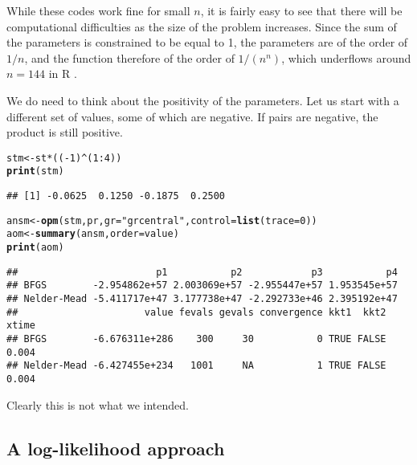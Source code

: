 \documentclass[11pt]{article}\usepackage[]{graphicx}\usepackage[]{color}
\makeatletter
\newcommand{\hlnum}[1]{\textcolor[rgb]{0.686,0.059,0.569}{#1}}%
\newcommand{\hlstr}[1]{\textcolor[rgb]{0.192,0.494,0.8}{#1}}%
\newcommand{\hlopt}[1]{\textcolor[rgb]{0,0,0}{#1}}%
\newcommand{\hlstd}[1]{\textcolor[rgb]{0.345,0.345,0.345}{#1}}%
\newcommand{\hlkwb}[1]{\textcolor[rgb]{0.69,0.353,0.396}{#1}}%
\newcommand{\hlkwc}[1]{\textcolor[rgb]{0.333,0.667,0.333}{#1}}%
\newcommand{\hlkwd}[1]{\textcolor[rgb]{0.737,0.353,0.396}{\textbf{#1}}}%
\newenvironment{kframe}{%
 \def\at@end@of@kframe{}%
 \ifinner\ifhmode%
  \def\at@end@of@kframe{\end{minipage}}%
  \begin{minipage}{\columnwidth}%
 \fi\fi%
 \def\FrameCommand##1{\hskip\@totalleftmargin \hskip-\fboxsep
 \colorbox{shadecolor}{##1}\hskip-\fboxsep
     \hskip-\linewidth \hskip-\@totalleftmargin \hskip\columnwidth}%
 \MakeFramed {\advance\hsize-\width
   \@totalleftmargin\z@ \linewidth\hsize
   \@setminipage}}%
 {\par\unskip\endMakeFramed%
 \at@end@of@kframe}
\newenvironment{knitrout}{}{} %
\newcommand{\R}{{\sf R }}
\makeatother
\begin{document}
While these codes work fine for small $n$, it is fairly easy to see that there will be 
computational difficulties as the size of the problem increases. Since the sum of the 
parameters is constrained to be equal to 1, the parameters are of the order of $1/n$,
and the function therefore of the order of $1/(n^n)$, which underflows around $n=144$ in 
\R. 

We do need to think about the positivity of the parameters. Let us start with 
a different set of values, some of which are negative. If pairs are negative, the 
product is still positive.

\begin{knitrout}\scriptsize
{}\color{fgcolor}\begin{kframe}
\begin{alltt}
\hlstd{stm} \hlkwb{<-} \hlstd{st}\hlopt{*}\hlstd{((}\hlopt{-}\hlnum{1}\hlstd{)}\hlopt{^}\hlstd{(}\hlnum{1}\hlopt{:}\hlnum{4}\hlstd{))}
\hlkwd{print}\hlstd{(stm)}
\end{alltt}
\begin{verbatim}
## [1] -0.0625  0.1250 -0.1875  0.2500
\end{verbatim}
\begin{alltt}
\hlstd{ansm}\hlkwb{<-}\hlkwd{opm}\hlstd{(stm, pr,} \hlkwc{gr}\hlstd{=}\hlstr{"grcentral"}\hlstd{,} \hlkwc{control}\hlstd{=}\hlkwd{list}\hlstd{(}\hlkwc{trace}\hlstd{=}\hlnum{0}\hlstd{))}
\hlstd{aom} \hlkwb{<-} \hlkwd{summary}\hlstd{(ansm,} \hlkwc{order}\hlstd{=value)}
\hlkwd{print}\hlstd{(aom)}
\end{alltt}
\begin{verbatim}
##                        p1           p2            p3           p4
## BFGS        -2.954862e+57 2.003069e+57 -2.955447e+57 1.953545e+57
## Nelder-Mead -5.411717e+47 3.177738e+47 -2.292733e+46 2.395192e+47
##                      value fevals gevals convergence kkt1  kkt2 xtime
## BFGS        -6.676311e+286    300     30           0 TRUE FALSE 0.004
## Nelder-Mead -6.427455e+234   1001     NA           1 TRUE FALSE 0.004
\end{verbatim}
\end{kframe}
\end{knitrout}

Clearly this is not what we intended.

\subsection{A log-likelihood approach}
\end{document}
